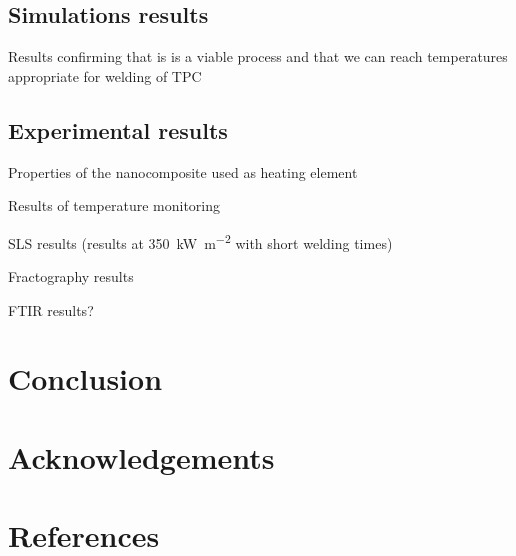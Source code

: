 \documentclass[11pt,review,times]{elsarticle}
\begin{document}
\subsection{Simulations results}

Results confirming that is is a viable process and that we can reach temperatures appropriate for welding of TPC

\subsection{Experimental results}

Properties of the nanocomposite used as heating element

Results of temperature monitoring

SLS results (results at \SI{350}{\kilo\watt\per\square\metre} with short welding times)

Fractography results

FTIR results?


							\section{Conclusion}



							\section{Acknowledgements}



							\section*{References}




\end{document}
